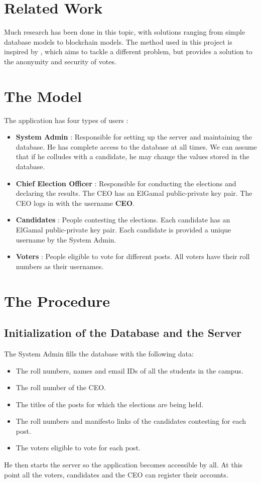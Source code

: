 \documentclass[twoside,twocolumn]{article}
\newcommand\tab[1][1cm]{\hspace*{#1}}
\begin{document}
\section{Related Work}
    \tab Much research has been done in this topic, with solutions ranging from simple database models to blockchain models. The method used in this project is inspired by \cite{PuppyLove}, which aims to tackle a different problem, but provides a solution to the anonymity and security of votes.


\section{The Model}
    \tab The application has four types of users :
    \begin{itemize}
        \item \textbf{System Admin} : Responsible for setting up the server and maintaining the database. He has complete access to the database at all times. We can assume that if he colludes with a     candidate, he may change the values stored in the database.
        \item \textbf{Chief Election Officer} : Responsible for conducting the elections and declaring the results. The CEO has an ElGamal public-private key pair. The CEO logs in with the username \textbf{CEO}.
        \item \textbf{Candidates} : People contesting the elections. Each candidate has an ElGamal public-private key pair. Each candidate is provided a unique username by the System Admin.
        \item \textbf{Voters} : People eligible to vote for different posts. All voters have their roll numbers as their usernames.
    \end{itemize}

\section{The Procedure}

\subsection{Initialization of the Database and the Server}
    \tab The System Admin fills the database with the following data:
    \begin{itemize}
        \item The roll numbers, names and email IDs of all the students in the campus.
        \item The roll number of the CEO.
        \item The titles of the posts for which the elections are being held.
        \item The roll numbers and manifesto links of the candidates contesting for each post.
        \item The voters eligible to vote for each post.
    \end{itemize} 
    \tab He then starts the server so the application becomes accessible by all. At this point all the voters, candidates and the CEO can register their accounts.
\end{document}

